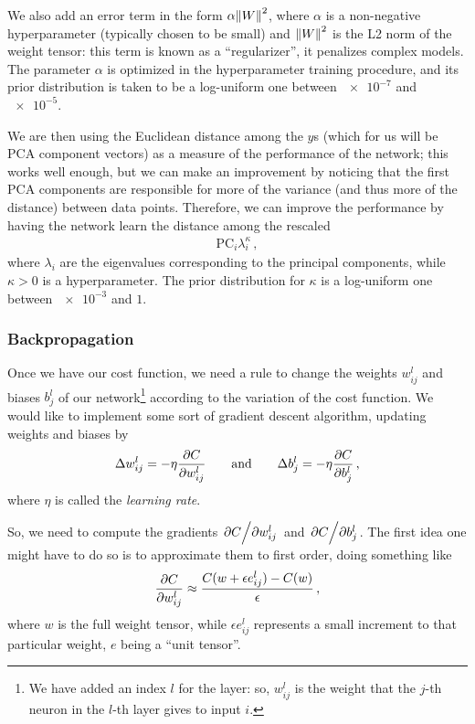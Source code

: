\documentclass[main.tex]{subfiles}
\begin{document}
We also add an error term in the form \(\alpha \norm{W}^2\), where \(\alpha \) is a non-negative hyperparameter (typically chosen to be small) and \(\norm{W}^2\) is the L2 norm of the weight tensor: this term is known as a ``regularizer'', it penalizes complex models.
The parameter \(\alpha \) is optimized in the hyperparameter training procedure, and its prior distribution is taken to be a log-uniform one between \(\num{e-7}\) and \(\num{e-5}\). 

We are then using the Euclidean distance among the \(y\)s (which for us will be \ac{PCA} component vectors) as a measure of the performance of the network; this works well enough, but we can make an improvement by noticing that the first PCA components are responsible for more of the variance (and thus more of the distance) between data points. 
Therefore, we can improve the performance by having the network learn the distance among the rescaled 
%
\begin{align}
\text{PC}_i \lambda_i^{\kappa }
\,,
\end{align}
%
where \(\lambda _i\) are the eigenvalues corresponding to the principal components, while \(\kappa > 0\) is a hyperparameter.
The prior distribution for \(\kappa \) is a log-uniform one between \(\num{e-3}\) and \(1\). 

\subsubsection{Backpropagation}

Once we have our cost function, we need a rule to change the weights \(w_{ij}^{l}\) and biases \(b_{j}^{l}\) of our network\footnote{We have added an index \(l\) for the layer: so, \(w_{ij}^{l}\) is the weight that the \(j\)-th neuron in the \(l\)-th layer gives to input \(i\).} according to the variation of the cost function. 
We would like to implement some sort of gradient descent algorithm, updating weights and biases by
%
\begin{align} \label{eq:gradient-descent-basic}
\Delta w_{ij}^{l} = - \eta \pdv{C}{w_{ij}^{l}} 
\qquad \text{and} \qquad
\Delta b_{j}^{l} = - \eta \pdv{C}{b_{j}^{l}}
\,,
\end{align}
%
where \(\eta \) is called the \emph{learning rate}. 

So, we need to compute the gradients \(\pdv*{C}{w_{ij}^{l}}\) and \(\pdv*{C}{b_{j}^{l}}\). 
The first idea one might have to do so is to approximate them to first order, doing something like 
%
\begin{align}
\pdv{C}{w_{ij}^{l}} \approx \frac{C(w + \epsilon e_{ij}^{l}) - C (w)}{\epsilon }
\,,
\end{align}
%
where \(w\) is the full weight tensor, while \(\epsilon e_{ij}^{l}\) represents a small increment to that particular weight, \(e\) being a ``unit tensor''.
\end{document}
